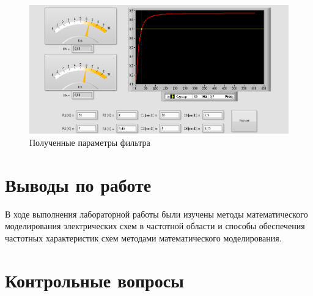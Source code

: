 \documentclass[a4paper,14pt]{article}
\begin{document}
\begin{figure}[H]
	\centering
	\includegraphics[width=0.9\linewidth]{image/work_2}
	\caption{Полученные параметры фильтра}
	\label{fig:work_2}
\end{figure}

\section{Выводы по работе}

В ходе выполнения лабораторной работы были изучены методы математического моделирования электрических схем в частотной области и способы обеспечения частотных характеристик схем методами математического моделирования.

\section{Контрольные вопросы}
\end{document}
